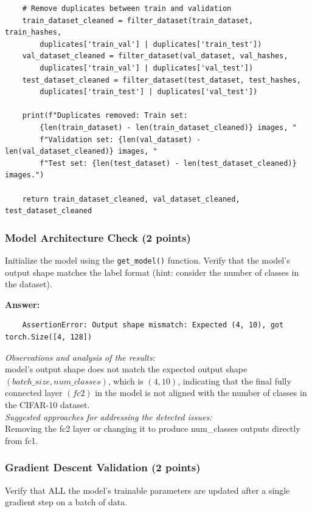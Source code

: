 \documentclass[11pt, oneside]{article}   	%
\begin{document}
\begin{verbatim}
    # Remove duplicates between train and validation
    train_dataset_cleaned = filter_dataset(train_dataset, train_hashes, 
        duplicates['train_val'] | duplicates['train_test'])
    val_dataset_cleaned = filter_dataset(val_dataset, val_hashes, 
        duplicates['train_val'] | duplicates['val_test'])
    test_dataset_cleaned = filter_dataset(test_dataset, test_hashes, 
        duplicates['train_test'] | duplicates['val_test'])

    print(f"Duplicates removed: Train set:
        {len(train_dataset) - len(train_dataset_cleaned)} images, "
        f"Validation set: {len(val_dataset) - len(val_dataset_cleaned)} images, "
        f"Test set: {len(test_dataset) - len(test_dataset_cleaned)} images.")

    return train_dataset_cleaned, val_dataset_cleaned, test_dataset_cleaned
\end{verbatim}

\subsubsection*{Model Architecture Check (2 points)}
Initialize the model using the \texttt{get\_model()} function. Verify that the model’s output shape matches the label format (hint: consider the number of classes in the dataset).

\textbf{Answer:} 
\begin{verbatim}
    AssertionError: Output shape mismatch: Expected (4, 10), got torch.Size([4, 128])
\end{verbatim}
\textit{Observations and analysis of the results: }
\\
model's output shape does not match the expected output shape $(batch\_size, num\_classes)$, which is $(4, 10)$, indicating that the final fully connected layer $(fc2)$ in the model is not aligned with the number of classes in the CIFAR-10 dataset.
\\
\textit{Suggested approaches for addressing the detected issues: }
\\
Removing the fc2 layer or changing it to produce num\_classes outputs directly from fc1.

\subsubsection*{Gradient Descent Validation (2 points)}
Verify that ALL the model's trainable parameters are updated after a single gradient step on a batch of data.
\end{document}
